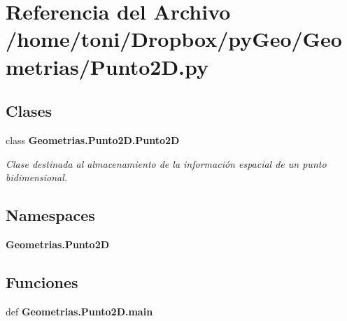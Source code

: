 \section{Referencia del Archivo /home/toni/\-Dropbox/py\-Geo/\-Geometrias/\-Punto2\-D.py}
\label{Punto2D_8py}
\subsection*{Clases}
\begin{DoxyCompactItemize}
\item 
class {\bf Geometrias.\-Punto2\-D.\-Punto2\-D}
\begin{DoxyCompactList}\small\item\em Clase destinada al almacenamiento de la información espacial de un punto bidimensional. \end{DoxyCompactList}\end{DoxyCompactItemize}
\subsection*{Namespaces}
\begin{DoxyCompactItemize}
\item 
{\bf Geometrias.\-Punto2\-D}
\end{DoxyCompactItemize}
\subsection*{Funciones}
\begin{DoxyCompactItemize}
\item 
def {\bf Geometrias.\-Punto2\-D.\-main}
\end{DoxyCompactItemize}
